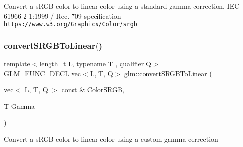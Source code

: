 Convert a s\+R\+GB color to linear color using a standard gamma correction. I\+EC 61966-\/2-\/1\+:1999 / Rec. 709 specification \href{https://www.w3.org/Graphics/Color/srgb}{\tt https\+://www.\+w3.\+org/\+Graphics/\+Color/srgb} \mbox{\label{group__gtc__color__space_gad1b91f27a9726c9cb403f9fee6e2e200}} 
\subsubsection{\texorpdfstring{convert\+S\+R\+G\+B\+To\+Linear()}{convertSRGBToLinear()}\hspace{0.1cm}{\footnotesize\ttfamily [2/2]}}
{\footnotesize\ttfamily template$<$length\+\_\+t L, typename T , qualifier Q$>$ \\
\hyperlink{setup_8hpp_ab2d052de21a70539923e9bcbf6e83a51}{G\+L\+M\+\_\+\+F\+U\+N\+C\+\_\+\+D\+E\+CL} \hyperlink{structglm_1_1vec}{vec}$<$L, T, Q$>$ glm\+::convert\+S\+R\+G\+B\+To\+Linear (\begin{DoxyParamCaption}\item[{\hyperlink{structglm_1_1vec}{vec}$<$ L, T, Q $>$ const \&}]{Color\+S\+R\+GB,  }\item[{T}]{Gamma }\end{DoxyParamCaption})}



Convert a s\+R\+GB color to linear color using a custom gamma correction. 

